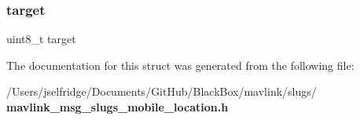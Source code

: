 \mbox{\label{struct____mavlink__slugs__mobile__location__t_a5f333beb3be5b82c1e091308136aeb7d}} 
\subsubsection{target}
{\footnotesize\ttfamily uint8\+\_\+t target}



The documentation for this struct was generated from the following file\+:\begin{DoxyCompactItemize}
\item 
/\+Users/jselfridge/\+Documents/\+Git\+Hub/\+Black\+Box/mavlink/slugs/\textbf{ mavlink\+\_\+msg\+\_\+slugs\+\_\+mobile\+\_\+location.\+h}\end{DoxyCompactItemize}
